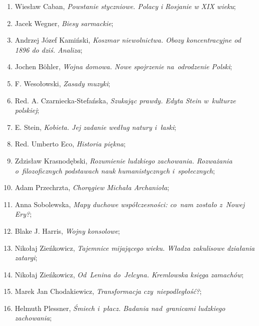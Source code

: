 \documentclass[a4paper,11pt]{article}
\begin{document}
\begin{enumerate}
\item Wiesław Caban, \textit{Powstanie styczniowe. Polacy i Rosjanie w
    XIX wieku};

\item Jacek Wegner, \textit{Biesy sarmackie};

\item Andrzej Józef Kamiński, \textit{Koszmar niewolnictwa. Obozy
    koncentracyjne od 1896 do dziś. Analiza};

\item Jochen B\"{o}hler, \textit{Wojna domowa. Nowe spojrzenie
    na~odrodzenie Polski};

\item F. Wesołowski, \textit{Zasady muzyki};

\item Red. A. Czarniecka-Stefańska, \textit{Szukając prawdy. Edyta Stein
    w~kulturze polskiej};

\item E. Stein, \textit{Kobieta. Jej zadanie według natury i~łaski};

\item Red. Umberto Eco, \textit{Historia piękna};

\item Zdzisław Krasnodębski, \textit{Rozumienie ludzkiego zachowania.
    Rozważania o~filozoficznych podstawach nauk humanistycznych
    i~społecznych};

\item Adam Przechrzta, \textit{Chorągiew Michała Archanioła};

\item Anna Sobolewska, \textit{Mapy duchowe współczesności: co~nam
    zostało z~Nowej Ery?};

\item Blake J. Harris, \textit{Wojny konsolowe};

\item Nikołaj Zieńkowicz, \textit{Tajemnice mijającego wieku. Władza
    zakulisowe działania zatargi};

\item Nikołaj Zieńkowicz, \textit{Od~Lenina do~Jelcyna. Kremlowska
    księga zamachów};

\item Marek Jan Chodakiewicz, \textit{Transformacja czy~niepodległość?};

\item Helmuth Plessner, \textit{Śmiech i~płacz. Badania nad~granicami
    ludzkiego zachowania};


\end{enumerate}
\end{document}
